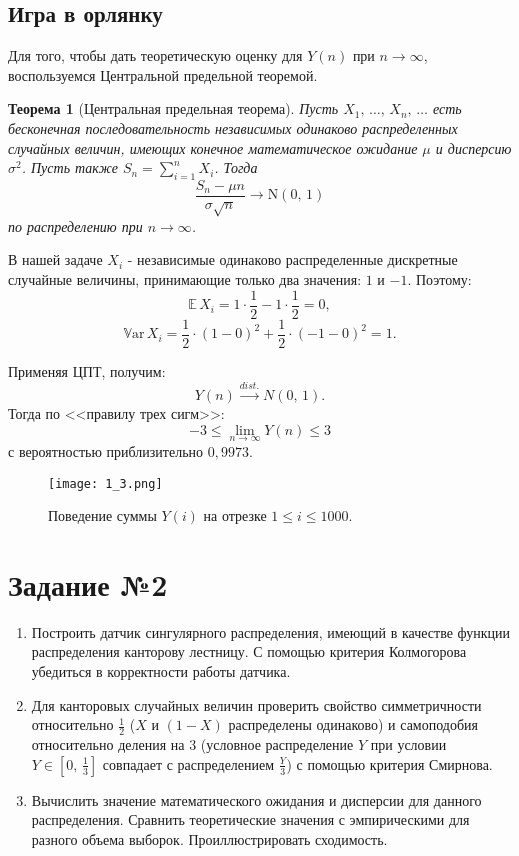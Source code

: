\documentclass[a4paper, 11pt]{article}
\theoremstyle{def}
\theoremstyle{th}
\newtheorem{theorem}{Теорема}[section]
\theoremstyle{rem}
\newcommand{\E}{\mathbb{E}}
\newcommand{\Var}{\mathbb{V}\mbox{ar}}
\begin{document}
\subsection{Игра в орлянку}

Для того, чтобы дать теоретическую оценку для $Y(n)$ при $n \to\infty$, воспользуемся Центральной предельной теоремой.

\begin{theorem}[Центральная предельная теорема]
        Пусть $X_1,\,\ldots,\,X_n,\,\ldots$ есть бесконечная последовательность независимых одинаково распределенных случайных величин, имеющих конечное математическое ожидание $\mu$ и дисперсию $\sigma^2$. Пусть также $S_n = \sum_{i=1}^{n} X_i$. Тогда
        $$
                \frac{S_n - \mu n}{\sigma\sqrt{n}} \longrightarrow \mbox{N}(0,\, 1)
        $$
        по распределению при $n\to\infty$.
\end{theorem}

В нашей задаче $X_i$ - независимые одинаково распределенные дискретные случайные величины, принимающие только два значения: $1$ и $-1$. Поэтому:
$$
        \E\,X_i = 1 \cdot \frac12 - 1 \cdot \frac12 = 0,
$$
$$
        \Var\,X_i = \frac12 \cdot (1 - 0)^2 + \frac12 \cdot (-1 - 0)^2 = 1.
$$

Применяя ЦПТ, получим:
$$
    Y(n) \xrightarrow{dist.} N(0,\,1).
$$
Тогда по <<правилу трех сигм>>:
$$
        -3\leqslant\lim\limits_{n\to\infty}Y(n)\leqslant 3
$$
с вероятностью приблизительно $0,9973$.
\begin{figure}[h]
        \noindent
        \centering \texttt{[image: 1\_3.png]}
        \caption{Поведение суммы $Y(i)$ на отрезке $1 \leqslant i\leqslant 1000$.}
\end{figure}





\section{Задание №2}

\begin{enumerate}
        \item Построить датчик сингулярного распределения, имеющий в качестве функции распределения канторову лестницу. С помощью критерия Колмогорова убедиться в корректности работы датчика.
        \item Для канторовых случайных величин проверить свойство симметричности относительно $\frac12$ ($X$ и $(1 - X)$ распределены одинаково) и самоподобия относительно деления на $3$ (условное распределение $Y$ при условии $Y\in[0,\,\frac13]$ совпадает с распределением $\frac{Y}{3}$) с помощью критерия Смирнова.
        \item Вычислить значение математического ожидания и дисперсии для данного распределения. Сравнить теоретические значения с эмпирическими для разного объема выборок. Проиллюстрировать сходимость.
\end{enumerate}
\end{document}
